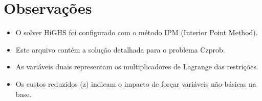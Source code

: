 \documentclass[12pt]{article}
\begin{document}
\section{Observações}

\begin{itemize}
\item O solver HiGHS foi configurado com o método IPM (Interior Point Method).
\item Este arquivo contém a solução detalhada para o problema Czprob.
\item As variáveis duais representam os multiplicadores de Lagrange das restrições.
\item Os custos reduzidos (z) indicam o impacto de forçar variáveis não-básicas na base.
\end{itemize}
\end{document}
